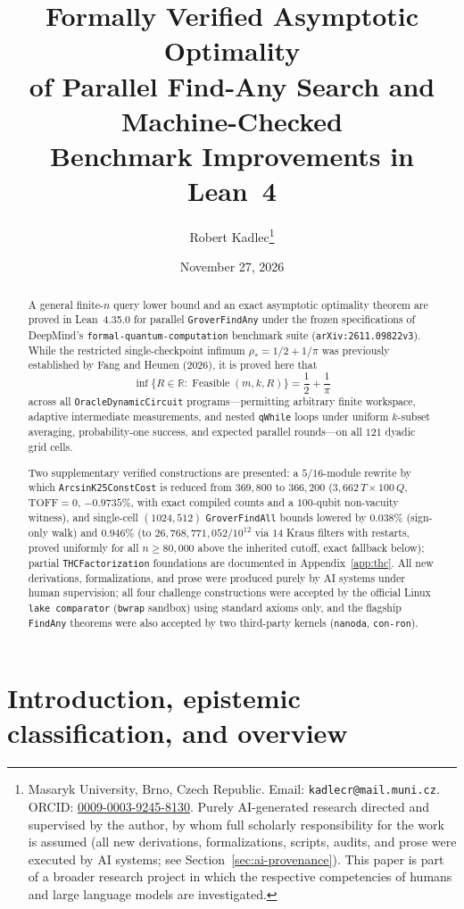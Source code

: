 \documentclass[11pt,a4paper]{article}
\title{Formally Verified Asymptotic Optimality\\
of Parallel Find-Any Search and Machine-Checked\\
Benchmark Improvements in Lean~4}
\author{Robert Kadlec\thanks{Masaryk University, Brno, Czech Republic. Email: \texttt{kadlecr@mail.muni.cz}. ORCID: \href{https://orcid.org/0009-0003-9245-8130}{0009-0003-9245-8130}. Purely AI-generated research directed and supervised by the author, by whom full scholarly responsibility for the work is assumed (all new derivations, formalizations, scripts, audits, and prose were executed by AI systems; see Section~\ref{sec:ai-provenance}). This paper is part of a broader research project in which the respective competencies of humans and large language models are investigated.}}
\date{November 27, 2026}
\theoremstyle{definition}
\theoremstyle{remark}
\begin{document}
\maketitle

\begin{abstract}
A general finite-\(n\) query lower bound and an exact asymptotic optimality theorem are proved in Lean~4.35.0 for parallel \texttt{GroverFindAny} under the frozen specifications of DeepMind's \texttt{formal-quantum-\allowbreak computation} benchmark suite (\texttt{arXiv:2611.09822v3}). While the restricted single-checkpoint infimum \(\rho_* = 1/2 + 1/\pi\) was previously established by Fang and Heunen (2026), it is proved here that
\[
  \inf\{R \in \mathbb{R} : \operatorname{Feasible}(m,k,R)\} = \frac{1}{2} + \frac{1}{\pi}
\]
across all \texttt{OracleDynamic\allowbreak Circuit} programs---permitting arbitrary finite workspace, adaptive intermediate measurements, and nested \texttt{qWhile} loops under uniform \(k\)-subset averaging, probability-one success, and expected parallel rounds---on all \(121\) dyadic grid cells.

Two supplementary verified constructions are presented: a \(5/16\)-module rewrite by which \texttt{ArcsinK25\allowbreak ConstCost} is reduced from \(369{,}800\) to \(366{,}200\) (\(3{,}662\,T \times 100\,Q\), \(\mathrm{TOFF}=0\), \(-0.9735\%\), with exact compiled counts and a \(100\)-qubit non-vacuity witness), and single-cell \((1024,512)\) \texttt{GroverFindAll} bounds lowered by \(0.038\%\) (sign-only walk) and \(0.946\%\) (to \(26{,}768{,}771{,}052/10^{12}\) via \(14\) Kraus filters with restarts, proved uniformly for all \(n \ge 80{,}000\) above the inherited cutoff, exact fallback below); partial \texttt{THC\allowbreak Factorization} foundations are documented in Appendix~\ref{app:thc}. All new derivations, formalizations, and prose were produced purely by AI systems under human supervision; all four challenge constructions were accepted by the official Linux \texttt{lake comparator} (\texttt{bwrap} sandbox) using standard axioms only, and the flagship \texttt{FindAny} theorems were also accepted by two third-party kernels (\texttt{nanoda}, \texttt{con-ron}).
\end{abstract}

\section{Introduction, epistemic classification, and overview}
\label{sec:intro}
\end{document}
